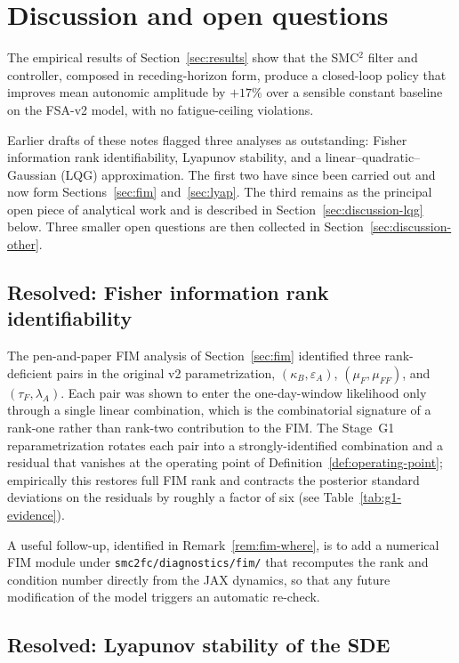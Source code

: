 \section{Discussion and open questions}\label{sec:discussion}

The empirical results of Section~\ref{sec:results} show that the
SMC${}^2$ filter and controller, composed in receding-horizon form,
produce a closed-loop policy that improves mean autonomic amplitude by
$+17\%$ over a sensible constant baseline on the FSA-v2 model, with no
fatigue-ceiling violations.

Earlier drafts of these notes flagged three analyses as outstanding:
Fisher information rank identifiability, Lyapunov stability, and a
linear--quadratic--Gaussian (LQG) approximation. The first two have
since been carried out and now form Sections~\ref{sec:fim}
and~\ref{sec:lyap}. The third remains as the principal open piece of
analytical work and is described in
Section~\ref{sec:discussion-lqg} below. Three smaller open questions
are then collected in Section~\ref{sec:discussion-other}.

\subsection{Resolved: Fisher information rank
identifiability}\label{sec:discussion-fim}

The pen-and-paper FIM analysis of Section~\ref{sec:fim} identified
three rank-deficient pairs in the original v2 parametrization,
$(\kappa_B,\varepsilon_A)$, $(\mu_F,\mu_{FF})$, and
$(\tau_F,\lambda_A)$. Each pair was shown to enter the one-day-window
likelihood only through a single linear combination, which is the
combinatorial signature of a rank-one rather than rank-two contribution
to the FIM. The Stage~G1 reparametrization rotates each pair into a
strongly-identified combination and a residual that vanishes at the
operating point of Definition~\ref{def:operating-point}; empirically
this restores full FIM rank and contracts the posterior standard
deviations on the residuals by roughly a factor of six (see
Table~\ref{tab:g1-evidence}).

A useful follow-up, identified in Remark~\ref{rem:fim-where}, is to
add a numerical FIM module under
\texttt{smc2fc/diagnostics/fim/} that recomputes the rank and
condition number directly from the JAX dynamics, so that any future
modification of the model triggers an automatic re-check.

\subsection{Resolved: Lyapunov stability of the
SDE}\label{sec:discussion-lyap}

